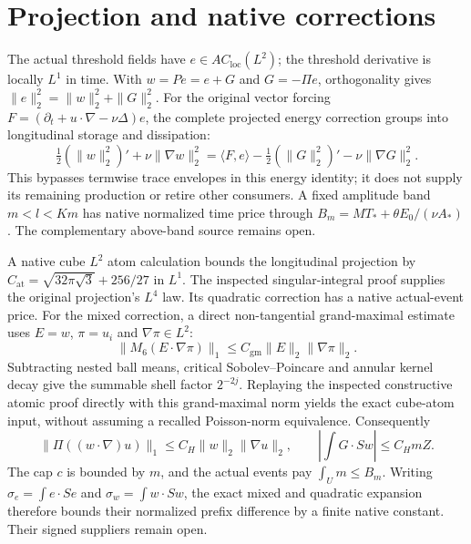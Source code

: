 \documentclass[11pt]{article}
\begin{document}
\section{Projection and native corrections}
The actual threshold fields have $e\in AC_{\mathrm{loc}}(L^2)$;
the threshold derivative is locally $L^1$ in time. With
$w=Pe=e+G$ and $G=-\Pi e$, orthogonality gives
$\|e\|_2^2=\|w\|_2^2+\|G\|_2^2$. For the original vector forcing
$F=(\partial_t+u\cdot\nabla-\nu\Delta)e$, the complete projected
energy correction groups into longitudinal storage and dissipation:
\[
 \tfrac12(\|w\|_2^2)' +\nu\|\nabla w\|_2^2
 =\langle F,e\rangle-\tfrac12(\|G\|_2^2)'
                         -\nu\|\nabla G\|_2^2.
\]
This bypasses termwise trace envelopes in this energy identity; it does
not supply its remaining production or retire other consumers.
A fixed amplitude band $m<l<Km$ has native normalized time price through
$B_m=MT_*+\theta E_0/(\nu A_*)$. The complementary above-band source
remains open.

A native cube $L^2$ atom calculation bounds the longitudinal projection
by $C_{\mathrm{at}}=\sqrt{32\pi\sqrt3}+256/27$ in $L^1$.
The inspected singular-integral proof supplies the original projection's
$L^4$ law. Its quadratic correction has a native actual-event price.
For the mixed correction, a direct non-tangential grand-maximal estimate
uses $E=w$, $\pi=u_i$ and $\nabla\pi\in L^2$:
\[
 \|M_6(E\cdot\nabla\pi)\|_1
       \le C_{\mathrm{gm}}\|E\|_2\|\nabla\pi\|_2.
\]
Subtracting nested ball means, critical Sobolev--Poincare and annular
kernel decay give the summable shell factor $2^{-2j}$. Replaying the
inspected constructive atomic proof directly with this grand-maximal
norm yields the exact cube-atom input, without assuming a recalled
Poisson-norm equivalence. Consequently
\[
 \|\Pi((w\cdot\nabla)u)\|_1
       \le C_H\|w\|_2\|\nabla u\|_2,
 \qquad \left|\int G\cdot Sw\right|\le C_HmZ.
\]
The cap $c$ is bounded by $m$, and the actual events pay $\int_Um\le B_m$.
Writing $\sigma_e=\int e\cdot Se$ and $\sigma_w=\int w\cdot Sw$, the exact
mixed and quadratic expansion therefore bounds their normalized prefix
difference by a finite native constant. Their signed suppliers remain open.
\end{document}
